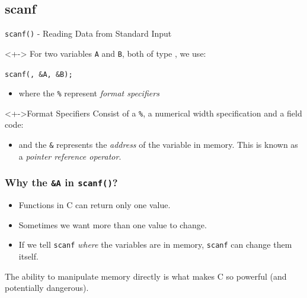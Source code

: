 \documentclass[smaller,handout,table]{beamer}
\begin{document}
\subsection{scanf}
\begin{frame}{{\tt scanf()} - Reading Data from Standard Input}
\begin{block}<+->{}
For two variables {\tt A} and {\tt B}, both of type , we use:
\begin{center}
\tt scanf(, \&A, \&B);
\end{center}
\begin{itemize}
\item where the {\tt\%} represent \emph{format specifiers}
\end{itemize}
\end{block}
\begin{block}<+->{Format Specifiers}
Consist of a {\tt\%}, a numerical width specification and a field code:
\begin{itemize}
\item and the {\tt\&} represents the \emph{address} of the variable in memory. This is known as a \emph{pointer reference operator}.
\end{itemize}
\end{block}
\end{frame}

\begin{frame}
\frametitle{Why the {\tt \&A} in {\tt scanf()}?}
\begin{itemize}
\item Functions in C can return only one value.
\item Sometimes we want more than one value to change.
\item If we tell {\tt scanf} \emph{where} the variables are in memory,
{\tt scanf} can change them itself.
\end{itemize}

\begin{alertblock}{}
The ability to manipulate memory directly is what makes C so powerful
(and potentially dangerous).
\end{alertblock}
\end{frame}
\end{document}
